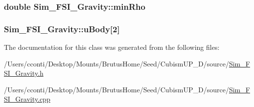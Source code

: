 \subsubsection[{min\+Rho}]{\setlength{\rightskip}{0pt plus 5cm}double Sim\+\_\+\+F\+S\+I\+\_\+\+Gravity\+::min\+Rho\hspace{0.3cm}{\ttfamily [protected]}}\label{class_sim___f_s_i___gravity_a29e377488239d27f0a112ce9e4bf1e97}
\hypertarget{class_sim___f_s_i___gravity_af025ee4e8818049798588010ed5ec20b}{}
\subsubsection[{u\+Body}]{ Sim\+\_\+\+F\+S\+I\+\_\+\+Gravity\+::u\+Body\mbox{[}2\mbox{]}\hspace{0.3cm}{\ttfamily [protected]}}\label{class_sim___f_s_i___gravity_af025ee4e8818049798588010ed5ec20b}


The documentation for this class was generated from the following files\+:\begin{DoxyCompactItemize}
\item 
/\+Users/cconti/\+Desktop/\+Mounts/\+Brutus\+Home/\+Seed/\+Cubism\+U\+P\+\_\+D/source/\hyperlink{_sim___f_s_i___gravity_8h}{Sim\+\_\+\+F\+S\+I\+\_\+\+Gravity.\+h}\item 
/\+Users/cconti/\+Desktop/\+Mounts/\+Brutus\+Home/\+Seed/\+Cubism\+U\+P\+\_\+D/source/\hyperlink{_sim___f_s_i___gravity_8cpp}{Sim\+\_\+\+F\+S\+I\+\_\+\+Gravity.\+cpp}\end{DoxyCompactItemize}
